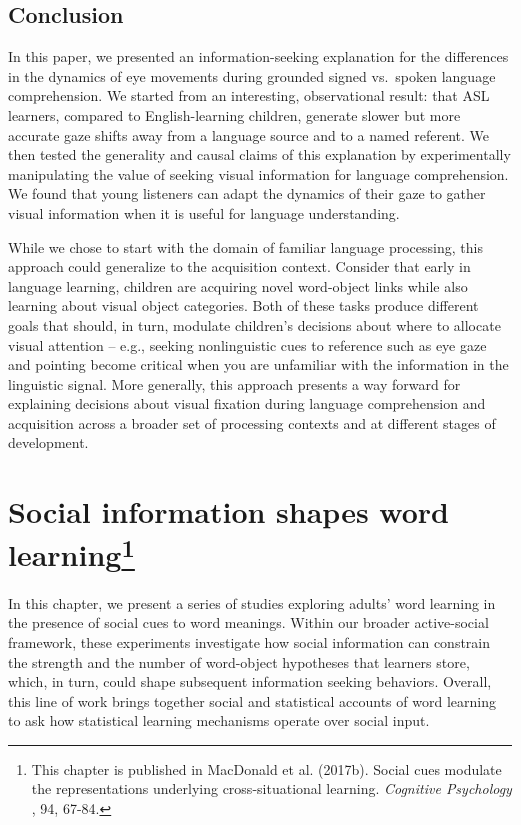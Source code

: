 \documentclass[oneside]{report}
\begin{document}
\section{Conclusion}\label{conclusion-1}

In this paper, we presented an information-seeking explanation for the
differences in the dynamics of eye movements during grounded signed
vs.~spoken language comprehension. We started from an interesting,
observational result: that ASL learners, compared to English-learning
children, generate slower but more accurate gaze shifts away from a
language source and to a named referent. We then tested the generality
and causal claims of this explanation by experimentally manipulating the
value of seeking visual information for language comprehension. We found
that young listeners can adapt the dynamics of their gaze to gather
visual information when it is useful for language understanding.

While we chose to start with the domain of familiar language processing,
this approach could generalize to the acquisition context. Consider that
early in language learning, children are acquiring novel word-object
links while also learning about visual object categories. Both of these
tasks produce different goals that should, in turn, modulate children's
decisions about where to allocate visual attention -- e.g., seeking
nonlinguistic cues to reference such as eye gaze and pointing become
critical when you are unfamiliar with the information in the linguistic
signal. More generally, this approach presents a way forward for
explaining decisions about visual fixation during language comprehension
and acquisition across a broader set of processing contexts and at
different stages of development.

\chapter[Social information shapes word learning]{\texorpdfstring{Social
information shapes word learning\footnote{This chapter is published in
  MacDonald et al. (2017b). Social cues modulate the representations
  underlying cross-situational learning. \emph{Cognitive Psychology },
  94, 67-84.}}{Social information shapes word learning}}\label{social-information-shapes-word-learning}

In this chapter, we present a series of studies exploring adults' word
learning in the presence of social cues to word meanings. Within our
broader active-social framework, these experiments investigate how
social information can constrain the strength and the number of
word-object hypotheses that learners store, which, in turn, could shape
subsequent information seeking behaviors. Overall, this line of work
brings together social and statistical accounts of word learning to ask
how statistical learning mechanisms operate over social input.
\end{document}
